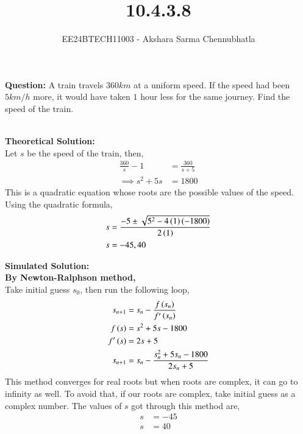 \documentclass[journal, article]{IEEEtran}
\begin{document}

\vspace{3cm}

\title{10.4.3.8}
\author{EE24BTECH11003 - Akshara Sarma Chennubhatla}
{\let\newpage\relax\maketitle}
\textbf{Question:}
A train travels $360km$ at a uniform speed. If the speed had been $5km/h$ more, it would have taken $1$ hour less for the same journey. Find the speed of the train.

\solution\\
\textbf{Theoretical Solution:}\\

Let $s$ be the speed of the train, then,
\begin{align}
	\frac{360}{s} - 1 &= \frac{360}{s + 5}\\
	\implies s^2 + 5s &= 1800
\end{align}
This is a quadratic equation whose roots are the possible values of the speed.\\
Using the quadratic formula,
\begin{align}
	s &= \frac{-5 \pm \sqrt{5^2 - 4\left(1\right)\left(-1800\right)}}{2\left(1\right)}\\
	s &= -45, 40
\end{align}

\textbf{Simulated Solution:}\\

\textbf{By Newton-Ralphson method,}\\
Take initial guess $s_0$, then run the following loop,
\begin{align}
	s_{n+1} &= s_n - \frac{f\left(s_n\right)}{f^\prime\left(s_n\right)}\\
	f\left(s\right) &= s^2 + 5s - 1800\\
	f^\prime\left(s\right) &= 2s + 5\\
	s_{n+1} &= s_n - \frac{s_n^2 + 5s_n - 1800}{2s_n + 5}
\end{align}
This method converges for real roots but when roots are complex, it can go to infinity as well. To avoid that, if our roots are complex, take initial guess as a complex number.
The values of $s$ got through this method are,
\begin{align}
	s &= -45\\
	s &= 40
\end{align}
\end{document}
